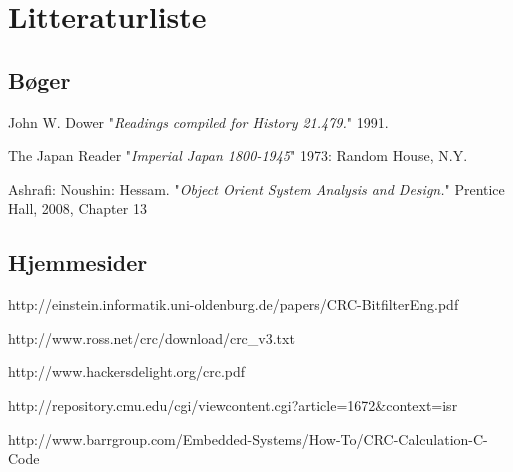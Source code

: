 \section{Litteraturliste}
\begingroup
\renewcommand{\section}[2]{}%

\begin{thebibliography}{1}
	\subsection{Bøger}
   John W. Dower "{\em Readings compiled for History
  21.479.}"  1991. %

    The Japan Reader "{\em Imperial Japan 1800-1945}" 1973:
  Random House, N.Y. %
  
   Ashrafi: Noushin: Hessam. "{\em Object Orient System Analysis and Design.}" Prentice Hall, 2008, Chapter 13
  
	\subsection{Hjemmesider}
   {http://einstein.informatik.uni-oldenburg.de/papers/CRC-BitfilterEng.pdf}

   {http://www.ross.net/crc/download/crc\_v3.txt}
  
   {http://www.hackersdelight.org/crc.pdf}
  
  {http://repository.cmu.edu/cgi/viewcontent.cgi?article=1672\&context=isr}
  
  {http://www.barrgroup.com/Embedded-Systems/How-To/CRC-Calculation-C-Code}
  \end{thebibliography}